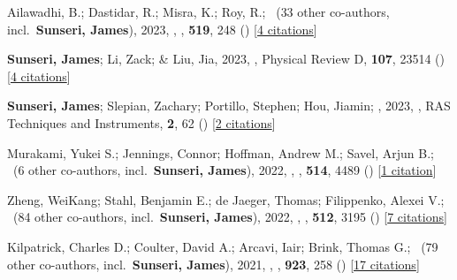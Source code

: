 \item Ailawadhi, B.; Dastidar, R.; Misra, K.; Roy, R.; \etal\ ({33} other co-authors, incl.\ \textbf{Sunseri, James}), 2023, , \mnras, \textbf{519}, 248 () [\href{https://ui.adsabs.harvard.edu/abs/2023MNRAS.519..248A}{4 citations}]

\item \textbf{Sunseri, James}; Li, Zack; \& Liu, Jia, 2023, , Physical Review D, \textbf{107}, 23514 () [\href{https://ui.adsabs.harvard.edu/abs/2023PhRvD.107b3514S}{4 citations}]

\item \textbf{Sunseri, James}; Slepian, Zachary; Portillo, Stephen; Hou, Jiamin; \etal, 2023, , RAS Techniques and Instruments, \textbf{2}, 62 () [\href{https://ui.adsabs.harvard.edu/abs/2023RASTI...2...62S}{2 citations}]

\item Murakami, Yukei S.; Jennings, Connor; Hoffman, Andrew M.; Savel, Arjun B.; \etal\ ({6} other co-authors, incl.\ \textbf{Sunseri, James}), 2022, , \mnras, \textbf{514}, 4489 () [\href{https://ui.adsabs.harvard.edu/abs/2022MNRAS.514.4489M}{1 citation}]

\item Zheng, WeiKang; Stahl, Benjamin E.; de Jaeger, Thomas; Filippenko, Alexei V.; \etal\ ({84} other co-authors, incl.\ \textbf{Sunseri, James}), 2022, , \mnras, \textbf{512}, 3195 () [\href{https://ui.adsabs.harvard.edu/abs/2022MNRAS.512.3195Z}{7 citations}]

\item Kilpatrick, Charles D.; Coulter, David A.; Arcavi, Iair; Brink, Thomas G.; \etal\ ({79} other co-authors, incl.\ \textbf{Sunseri, James}), 2021, , \apj, \textbf{923}, 258 () [\href{https://ui.adsabs.harvard.edu/abs/2021ApJ...923..258K}{17 citations}]